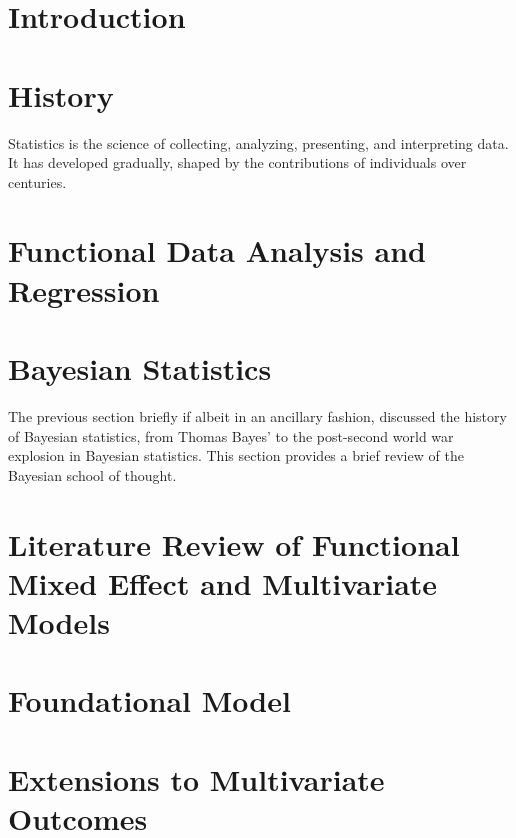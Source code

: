 \documentclass[11pt,expanded,copyright]{template/fsuthesis}
\begin{document}
\tableofcontents
\listoftables
\listoffigures

\begin{abstract}
Write your abstract here.
\end{abstract}

\mainmatter

\chapter{Introduction}
  

\chapter{History}
Statistics is the science of collecting, analyzing, presenting, and interpreting data.  
It has developed gradually, shaped by the contributions of individuals over centuries.
  

\chapter{Functional Data Analysis and Regression}


\chapter{Bayesian Statistics}
The previous section briefly if albeit in an ancillary fashion, discussed the history of Bayesian statistics, from Thomas Bayes' to the post-second world war explosion in Bayesian statistics.  
This section provides a brief review of the Bayesian school of thought.


\chapter{Literature Review of Functional Mixed Effect and Multivariate Models}


\chapter{Foundational Model}


\chapter{Extensions to Multivariate Outcomes}

\end{document}
